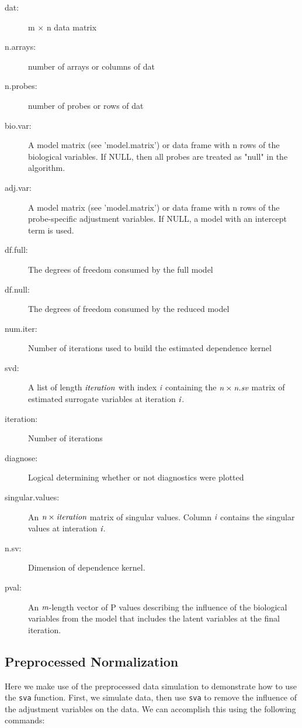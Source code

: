 \documentclass[11pt]{article}
\newcommand{\Rfunction}[1]{{\texttt{#1}}}
\begin{document}
\begin{description}
\item[dat:] m $\times$ n data matrix
\item[n.arrays:] number of arrays or columns of dat
\item[n.probes:] number of probes or rows of dat
\item[bio.var:] A model matrix (see 'model.matrix') or data frame with n rows of
the biological variables. If NULL, then all probes are treated as "null" in the algorithm.
\item[adj.var:] A model matrix (see 'model.matrix') or data frame with n rows of
the probe-specific adjustment variables.  If NULL, a model with an intercept term is used.
\item[df.full:] The degrees of freedom consumed by the full model
\item[df.null:] The degrees of freedom consumed by the reduced model
\item[num.iter:] Number of iterations used to build the estimated dependence
kernel 
\item[svd:] A list of length $\emph{iteration}$ with index $\emph{i}$ containing the 
$\emph{n} \times \emph{n.sv}$ matrix of estimated surrogate variables at iteration $\emph{i}$.
\item[iteration:] Number of iterations
\item[diagnose:] Logical determining whether or not diagnostics were plotted
\item[singular.values:] An $\emph{n} \times \emph{iteration}$ matrix of singular
values.  Column $\emph{i}$ contains the singular values at interation $\emph{i}$.
\item[n.sv:] Dimension of dependence kernel.
\item[pval:] An $\emph{m}$-length vector of P values describing the influence of
the biological variables from the model that includes the latent variables at
the final iteration. 
\end{description}

\subsection{Preprocessed Normalization}\label{sva_egPP}
Here we make use of the preprocessed data simulation to demonstrate how to use the \Rfunction{sva} function.
First, we simulate data, then use \Rfunction{sva} to remove the influence of the adjustment variables on the data.
We can accomplish this using the following commands:
\end{document}
